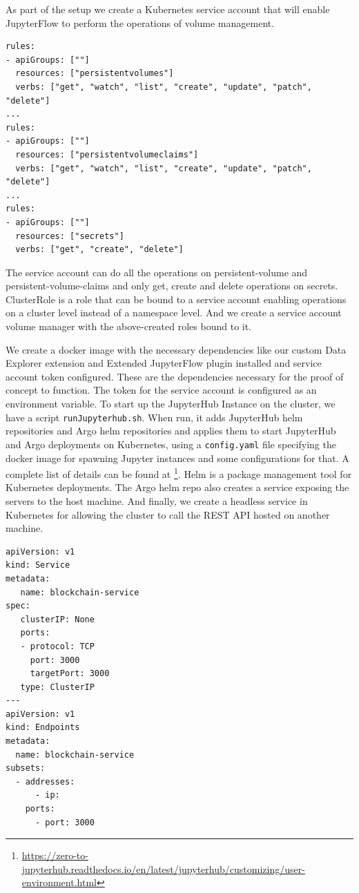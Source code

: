 \bigskip
As part of the setup we create a Kubernetes service account that will enable JupyterFlow to perform the operations of volume management.
\begin{lstlisting}[caption={Rules for volume-manager service account YAML configuration}]
rules:
- apiGroups: [""]
  resources: ["persistentvolumes"]
  verbs: ["get", "watch", "list", "create", "update", "patch", "delete"]
...
rules:
- apiGroups: [""]
  resources: ["persistentvolumeclaims"]
  verbs: ["get", "watch", "list", "create", "update", "patch", "delete"]
...
rules:
- apiGroups: [""]
  resources: ["secrets"]
  verbs: ["get", "create", "delete"]\end{lstlisting}
The service account can do all the operations on persistent-volume and persistent-volume-claims and only get, create and delete operations on secrets. ClusterRole is a role that can be bound to a service account enabling operations on a cluster level instead of a namespace level. And we create a service account volume manager with the above-created roles bound to it.

\bigskip
We create a docker image with the necessary dependencies like our custom Data Explorer extension and Extended JupyterFlow plugin installed and service account token configured. These are the dependencies necessary for the proof of concept to function. The token for the service account is configured as an environment variable. To start up the JupyterHub Instance on the cluster, we have a script \lstinline{runJupyterhub.sh}. When run, it adds JupyterHub helm repositories and Argo helm repositories and applies them to start JupyterHub and Argo deployments on Kubernetes, using a \lstinline{config.yaml} file specifying the docker image for spawning Jupyter instances and some configurations for that. A complete list of details can be found at \footnote{\url{https://zero-to-jupyterhub.readthedocs.io/en/latest/jupyterhub/customizing/user-environment.html}}. Helm is a package management tool for Kubernetes deployments. The Argo helm repo also creates a service exposing the servers to the host machine. And finally, we create a headless service in Kubernetes for allowing the cluster to call the REST API hosted on another machine.

\begin{lstlisting}[caption={Configuration for a headless service on Kubernetes}]
apiVersion: v1
kind: Service
metadata:
   name: blockchain-service
spec:
   clusterIP: None
   ports:
   - protocol: TCP
     port: 3000
     targetPort: 3000
   type: ClusterIP
---
apiVersion: v1
kind: Endpoints
metadata:
  name: blockchain-service
subsets:
  - addresses:
      - ip: 
    ports:
      - port: 3000
\end{lstlisting}


